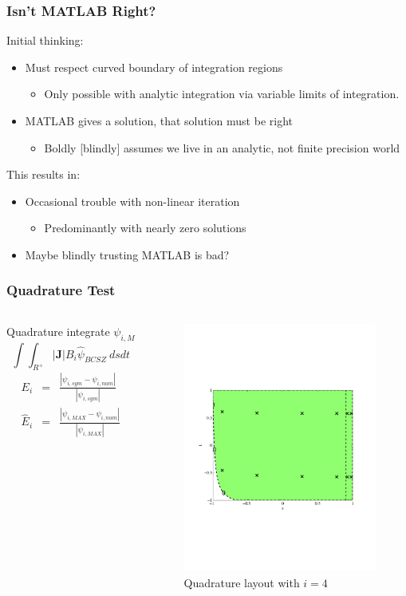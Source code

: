 \documentclass{beamer}
\newcommand{\be}{\begin{equation*}}   %
\newcommand{\ee}{\end{equation*}}
\newcommand{\bea}{\begin{eqnarray*}}  %
\newcommand{\eea}{\end{eqnarray*}}
\newcommand{\B}[1]{\ensuremath{B_{#1} }}			%
\newcommand{\abs}[1]{\ensuremath{\left\lvert #1 \right\rvert}}  %
\newcommand{\BCSZH}{\ensuremath{\widehat{\psi}_{BCSZ}}}
\begin{document}
\begin{frame}
\frametitle{Isn't MATLAB Right?}
Initial thinking:
\begin{itemize}
\item Must respect curved boundary of integration regions
%
\begin{itemize}
\item Only possible with analytic integration via variable limits of integration.
\end{itemize}
%
\item MATLAB gives a solution, that solution must be right
%
\begin{itemize}
\item Boldly [blindly] assumes we live in an analytic, not finite precision world
\end{itemize}
%
\end{itemize}
This results in:
\begin{itemize}
\item Occasional trouble with non-linear iteration
\begin{itemize}
\item Predominantly with nearly zero solutions
\end{itemize}
\item Maybe blindly trusting MATLAB is bad?
\end{itemize}

\end{frame}

\begin{frame}
\frametitle{Quadrature Test}
\begin{columns}[c]
Quadrature integrate $\psi_{i,M}$
\be 
\int{\int_{R^+}{\abs{\mathbf J}\B{i} \BCSZH~dsdt}}
\ee
\bea
E_{i} &=& \frac{\abs{ \psi_{i,sym} - \psi_{i,num} }}{\abs{\psi_{i,sym} }} \\
\widehat{E}_{i} &=& \frac{\abs{ \psi_{i,MAX} - \psi_{i,num} }}{\abs{\psi_{i,MAX} }}
\eea

\begin{figure}
\centering
\includegraphics[width=2.5in,trim=0.6in  2.5in  1.in 2.5in,clip=true]{quad_layout.pdf}
\caption{Quadrature layout with $i=4$}
\end{figure}
\end{columns}
\end{frame}
\end{document}
